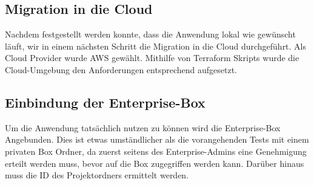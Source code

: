 \subsection{Migration in die Cloud}
Nachdem festgestellt werden konnte, dass die Anwendung lokal wie gewünscht läuft, wir in einem nächsten Schritt die Migration in die Cloud durchgeführt. Als Cloud Provider wurde \ac{AWS} gewählt. Mithilfe von \gls{Terraform} Skripts wurde die Cloud-Umgebung den Anforderungen entsprechend aufgesetzt.

\subsection{Einbindung der Enterprise-Box}
Um die Anwendung tatsächlich nutzen zu können wird die Enterprise-Box Angebunden. Dies ist etwas umständlicher als die vorangehenden Tests mit einem privaten Box Ordner, da zuerst seitens des Enterprise-Admins eine Genehmigung erteilt werden muss, bevor auf die Box zugegriffen werden kann. Darüber hinaus muss die ID des Projektordners ermittelt werden.
\pagebreak